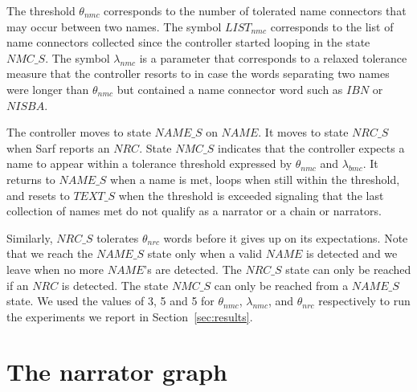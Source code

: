 \documentclass[11pt]{article}
\begin{document}
The threshold $\theta_{\mathit{nmc}}$ 
corresponds to the number of tolerated name connectors 
that may occur between two names. %
The symbol $\mathit{LIST}_{\mathit{nmc}}$ corresponds to the list 
of name connectors collected since the controller
started looping in the state $\mathit{NMC\_S}$.
The symbol $\lambda_{\mathit{nmc}}$ is a parameter 
that corresponds to a relaxed tolerance measure that
the controller resorts to in case the words separating
two names were longer than $\theta_{\mathit{nmc}}$ but 
contained a name connector word such as $\mathit{IBN}$ 
or $\mathit{NISBA}$.

The controller moves to state $\mathit{NAME\_S}$ on
$\mathit{NAME}$.
It moves to state $\mathit{NRC\_S}$ 
when Sarf reports an $\mathit{NRC}$.
State $\mathit{NMC\_S}$
indicates that the controller expects a name to appear within 
a tolerance threshold expressed by 
$\theta_{\mathit{nmc}}$ and $\lambda_{\mathit{bmc}}$.
It returns to $\mathit{NAME\_S}$ when a name is met, 
loops when still within the threshold, and 
resets to $\mathit{TEXT\_S}$ when the threshold is exceeded 
signaling that the last collection of names met do not qualify
as a narrator or a chain or narrators. 

Similarly, $\mathit{NRC\_S}$ tolerates $\theta_{\mathit{nrc}}$ words 
before it gives up on its expectations. 
Note that we reach the $\mathit{NAME\_S}$
state only when a
valid $\mathit{NAME}$ is detected and we leave when no 
more $\mathit{NAME}$'s are detected.
The $\mathit{NRC\_S}$ state can only be reached if an 
$\mathit{NRC}$ is detected.
The state $\mathit{NMC\_S}$ can only be reached from a 
$\mathit{NAME\_S}$ state.
We used the values of 3, 5 and 5 for $\theta_{\mathit{nmc}}$, 
$\lambda_{\mathit{nmc}}$, and 
$\theta_{\mathit{nrc}}$ respectively to run the experiments 
we report in Section~\ref{sec:results}.

\begin{figure}[tb!]
\end{figure}


\section{The narrator graph}
\end{document}

